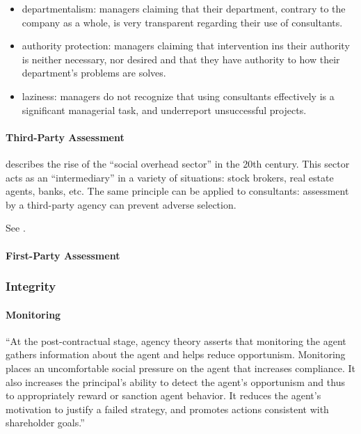 \documentclass[12pt]{article}
\begin{document}
\begin{itemize}
\item
  departmentalism: managers claiming that their department, contrary to
  the company as a whole, is very transparent regarding their use of
  consultants.
\item
  authority protection: managers claiming that intervention ins their
  authority is neither necessary, nor desired and that they have
  authority to how their department's problems are solves.
\item
  laziness: managers do not recognize that using consultants effectively
  is a significant managerial task, and underreport unsuccessful
  projects.
\end{itemize}

\hypertarget{third-party-assessment}{%
\paragraph{Third-Party Assessment}\label{third-party-assessment}}

\citet[57-62]{zucker1985} describes the rise of the ``social overhead
sector'' in the 20th century. This sector acts as an ``intermediary'' in
a variety of situations: stock brokers, real estate agents, banks, etc.
The same principle can be applied to consultants: assessment by a
third-party agency can prevent adverse selection.

See \citep[ 76-77]{armbruster2006}.

\hypertarget{first-party-assessment}{%
\paragraph{First-Party Assessment}\label{first-party-assessment}}

\hypertarget{integrity}{%
\subsubsection{Integrity}\label{integrity}}

\hypertarget{monitoring}{%
\paragraph{Monitoring}\label{monitoring}}

``At the post-contractual stage, agency theory asserts that monitoring
the agent gathers information about the agent and helps reduce
opportunism. Monitoring places an uncomfortable social pressure on the
agent that increases compliance. It also increases the principal's
ability to detect the agent's opportunism and thus to appropriately
reward or sanction agent behavior. It reduces the agent's motivation to
justify a failed strategy, and promotes actions consistent with
shareholder goals.'' \citep[ 13]{basu2011}
\end{document}
